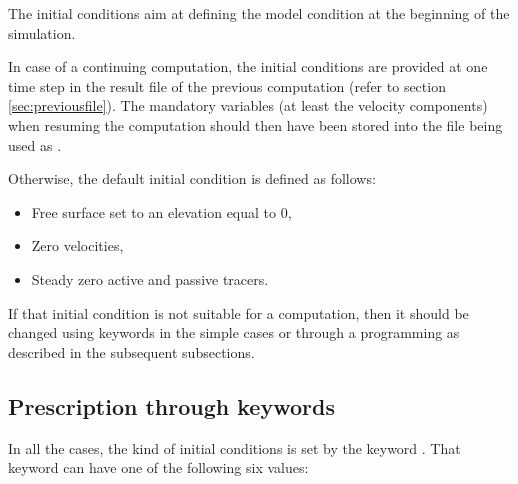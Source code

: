 The initial conditions aim at defining the model condition at the beginning of
the simulation.

In case of a continuing computation, the initial conditions are provided at one
time step in the result file of the previous computation (refer to section
\ref{sec:previousfile}).
The mandatory variables (at least the velocity components) when resuming
the computation should then have been stored into the file being used as
.

Otherwise, the default initial condition is defined as follows:

\begin{itemize}
\item Free surface set to an elevation equal to 0,

\item Zero velocities,

\item Steady zero active and passive tracers.
\end{itemize}

If that initial condition is not suitable for a computation, then it should be
changed using keywords in the simple cases or through a programming as
described in the subsequent subsections.


\subsection{Prescription through keywords}

In all the cases, the kind of initial conditions is set by the keyword
. That keyword can have one of the following six
values:

